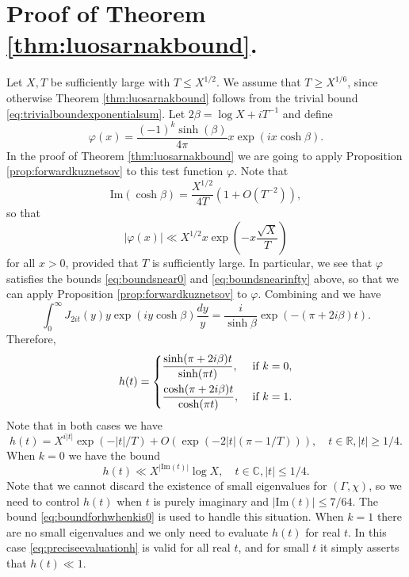 \documentclass{article}
\theoremstyle{named}
\newcommand{\CC}{\mathbb{C}}
\newcommand{\R}{\mathbb{R}}
\begin{document}
\section{Proof of Theorem \ref{thm:luosarnakbound}.}\label{sec:proofofluosarnakbound}
Let $X, T$ be sufficiently large with $T \leq X^{1/2}$. We assume that $T \geq X^{1/6}$, since otherwise Theorem \ref{thm:luosarnakbound} follows from the trivial bound \eqref{eq:trivialboundexponentialsum}. Let $2\beta = \log X + iT^{-1}$ and define
\begin{equation}\label{eq:deftestfunction}
    \varphi(x) = \frac{(-1)^k\sinh(\beta)}{4\pi} x\exp(ix\cosh \beta).
\end{equation}
In the proof of Theorem \ref{thm:luosarnakbound} we are going to apply Proposition \ref{prop:forwardkuznetsov} to this test function $\varphi$. Note that 
\begin{equation}
    \text{Im}(\cosh \beta) = \frac{X^{1/2}}{4T}\left(1 + O(T^{-2})\right),
\end{equation}
so that   
\begin{equation}\label{eq:testfunctionestimate}
    |\varphi(x)| \ll X^{1/2} x \exp(-x\frac{\sqrt{X}}{T})
\end{equation}
for all $x > 0$, provided that $T$ is sufficiently large. In particular, we see that $\varphi$ satisfies the bounds \eqref{eq:boundsnear0} and \eqref{eq:boundsnearinfty} above, so that we can apply Proposition \ref{prop:forwardkuznetsov} to $\varphi$. Combining \cite[\href{https://dlmf.nist.gov/10.22.E49}{(10.22.49)}]{dlmf} and \cite[\href{https://dlmf.nist.gov/15.4.E18}{(15.4.18)}]{dlmf} we have 
\begin{equation*}
    \int_0^\infty J_{2it}(y)y\exp(iy\cosh \beta)\frac{dy}{y} = \frac{i}{\sinh \beta} \exp(-(\pi + 2i\beta)t).
\end{equation*}
Therefore, 
\begin{equation}\label{eq:htestfunction}
    h(t) = \begin{dcases}
        \frac{\sinh(\pi + 2i\beta)t}{\sinh(\pi t)}, & \text{ if }k = 0,\\
        \frac{\cosh(\pi + 2i\beta)t}{\cosh(\pi t)}, & \text{ if }k = 1.
    \end{dcases}
\end{equation}
Note that in both cases we have  
\begin{equation}\label{eq:preciseevaluationh}
    h(t) = X^{i |t|}\exp(-|t|/T) + O(\exp(-2|t|(\pi - 1/T))), \quad t \in \R, |t| \geq 1/4.
\end{equation}
When $k = 0$ we have the bound
\begin{equation}\label{eq:boundforhwhenkis0}
    h(t) \ll X^{|\text{Im}(t)|} \log X, \quad t \in \CC, |t| \leq 1/4.
\end{equation}
Note that we cannot discard the existence of small eigenvalues for $(\Gamma, \chi)$, so we need to control $h(t)$ when $t$ is purely imaginary and $|\text{Im}(t)| \leq 7/64$. The bound \eqref{eq:boundforhwhenkis0} is used to handle this situation. When $k = 1$ there are no small eigenvalues and we only need to evaluate $h(t)$ for real $t$. In this case \eqref{eq:preciseevaluationh} is valid for all real $t$, and for small $t$ it simply asserts that $h(t) \ll 1$.
\end{document}
